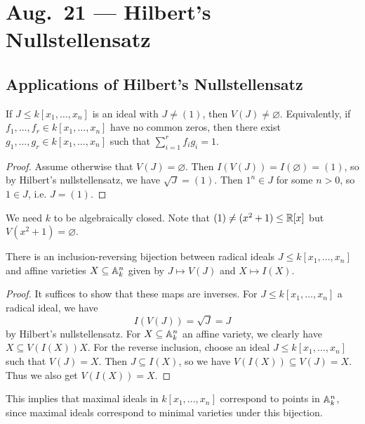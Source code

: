 \chapter{Aug.~21 --- Hilbert's Nullstellensatz}

\section{Applications of Hilbert's Nullstellensatz}

\begin{corollary}
  If $J \le k[x_1, \dots, x_n]$ is an
  ideal with $J \ne (1)$, then
  $V(J) \ne \varnothing$. Equivalently,
  if $f_1, \dots, f_r \in k[x_1, \dots, x_n]$
  have no common zeros, then there
  exist $g_1, \dots, g_r \in k[x_1, \dots, x_n]$
  such that $\sum_{i = 1}^r f_i g_i = 1$.
\end{corollary}

\begin{proof}
  Assume otherwise that $V(J) = \varnothing$.
  Then
  $I(V(J)) = I(\varnothing) = (1)$,
  so by Hilbert's nullstellensatz,
  we have $\sqrt{J} = (1)$. Then
  $1^n \in J$ for some $n > 0$, so
  $1 \in J$, i.e. $J = (1)$.
\end{proof}

\begin{remark}
  We need
  $k$ to be algebraically closed.
  Note that $(1) \ne (x^2 + 1) \le \mathbb{R}[x]$
  but $V(x^2 + 1) = \varnothing$.
\end{remark}

\begin{corollary}
  There is an inclusion-reversing bijection
  between radical ideals $J \le k[x_1, \dots, x_n]$ and
  affine varieties $X \subseteq \mathbb{A}_k^n$
  given by $J \mapsto V(J)$ and $X \mapsto I(X)$.
\end{corollary}

\begin{proof}
  It suffices to show that these maps
  are inverses. For $J \le k[x_1, \dots, x_n]$
  a radical ideal, we have
  \[
    I(V(J)) = \sqrt{J} = J
  \]
  by Hilbert's nullstellensatz. For
  $X \subseteq \mathbb{A}_k^n$ an affine
  variety, we clearly have
  $X \subseteq V(I(X)) X$. For the
  reverse inclusion, choose
  an ideal $J \le k[x_1, \dots, x_n]$
  such that $V(J) = X$. Then
  $J \subseteq I(X)$, so we have
  $V(I(X)) \subseteq V(J) = X$.
  Thus we also get $V(I(X)) = X$.
\end{proof}

\begin{remark}
  This implies that maximal ideals in
  $k[x_1, \dots, x_n]$ correspond to
  points in $\mathbb{A}_k^n$, since
  maximal ideals correspond to minimal
  varieties under this bijection.
\end{remark}

